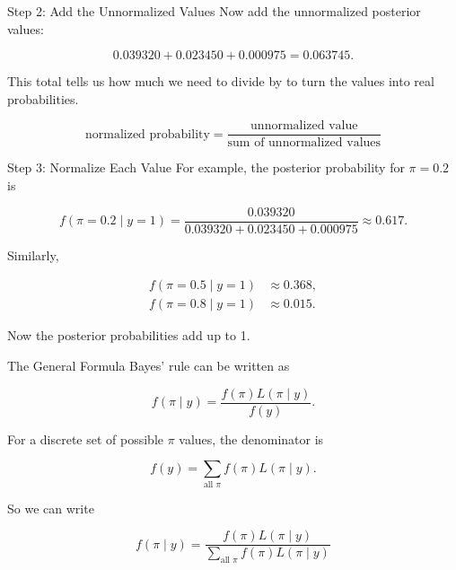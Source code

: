 \documentclass[12pt]{beamer}
\begin{document}
\begin{frame}{}
\begin{block}{Step 2: Add the Unnormalized Values}
Now add the unnormalized posterior values:

\[
0.039320 + 0.023450 + 0.000975 = 0.063745.
\]

\vspace{0.5cm}
This total tells us how much we need to divide by to turn the values into real probabilities.

\vspace{0.5cm}
\[
\boxed{\text{normalized probability}
= \frac{\text{unnormalized value}}{\text{sum of unnormalized values}}}
\]
\end{block}
\end{frame}

\begin{frame}{}
\begin{block}{Step 3: Normalize Each Value}
For example, the posterior probability for $\pi = 0.2$ is

\[
f(\pi = 0.2 \mid y = 1)
= \frac{0.039320}{0.039320 + 0.023450 + 0.000975}
\approx 0.617.
\]

\vspace{0.4cm}
Similarly,

\[
\begin{aligned}
f(\pi = 0.5 \mid y = 1) &\approx 0.368, \\
f(\pi = 0.8 \mid y = 1) &\approx 0.015.
\end{aligned}
\]

\vspace{0.3cm}
Now the posterior probabilities add up to 1.
\end{block}
\end{frame}

\begin{frame}{}
\begin{block}{The General Formula}
Bayes' rule can be written as

\[
f(\pi \mid y)
= \frac{f(\pi)L(\pi \mid y)}{f(y)}.
\]

\vspace{0.4cm}
For a discrete set of possible $\pi$ values, the denominator is

\[
f(y) = \sum_{\text{all } \pi} f(\pi)L(\pi \mid y).
\]

\vspace{0.4cm}
So we can write

\[
\boxed{
f(\pi \mid y)
= \frac{f(\pi)L(\pi \mid y)}
{\sum_{\text{all } \pi} f(\pi)L(\pi \mid y)}
}
\]
\end{block}
\end{frame}
\end{document}

